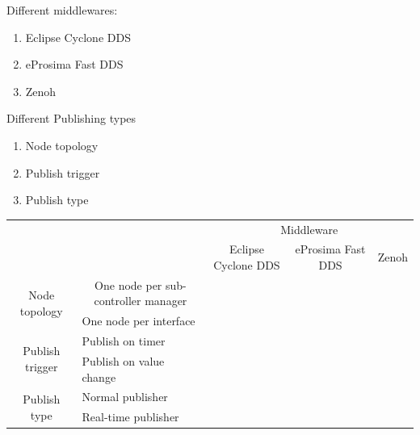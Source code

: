 Different middlewares:
\begin{enumerate}
    \item Eclipse Cyclone DDS
    \item eProsima Fast DDS
    \item Zenoh
\end{enumerate}
Different Publishing types
\begin{enumerate}
    \item Node topology
    \item Publish trigger
    \item Publish type 
\end{enumerate}

\begin{table}[]
\begin{tabular}{cl|lll}
\multicolumn{1}{l}{}                                  &                                                          & \multicolumn{3}{c}{Middleware}                                                                                \\ \cline{3-5} 
\multicolumn{1}{l}{}                                  &                                                          & \multicolumn{1}{c|}{Eclipse Cyclone DDS} & \multicolumn{1}{c|}{eProsima Fast DDS} & \multicolumn{1}{c}{Zenoh} \\ \hline
\multicolumn{1}{c|}{\multirow{2}{*}{Node topology}}   & \multicolumn{1}{c|}{One node per sub-controller manager} & \multicolumn{1}{l|}{}                    & \multicolumn{1}{l|}{}                  & \multicolumn{1}{l|}{}     \\ \cline{2-5} 
\multicolumn{1}{c|}{}                                 & One node per interface                                   & \multicolumn{1}{l|}{}                    & \multicolumn{1}{l|}{}                  & \multicolumn{1}{l|}{}     \\ \hline
\multicolumn{1}{c|}{\multirow{2}{*}{Publish trigger}} & Publish on timer                                         & \multicolumn{1}{l|}{}                    & \multicolumn{1}{l|}{}                  & \multicolumn{1}{l|}{}     \\ \cline{2-5} 
\multicolumn{1}{c|}{}                                 & Publish on value change                                  & \multicolumn{1}{l|}{}                    & \multicolumn{1}{l|}{}                  & \multicolumn{1}{l|}{}     \\ \hline
\multicolumn{1}{c|}{\multirow{2}{*}{Publish type}} & Normal publisher                                         & \multicolumn{1}{l|}{}                    & \multicolumn{1}{l|}{}                  & \multicolumn{1}{l|}{}     \\ \cline{2-5} 
\multicolumn{1}{c|}{}                                 & Real-time publisher                                      & \multicolumn{1}{l|}{}                    & \multicolumn{1}{l|}{}                  & \multicolumn{1}{l|}{}     \\ \hline
\end{tabular}
\end{table}

